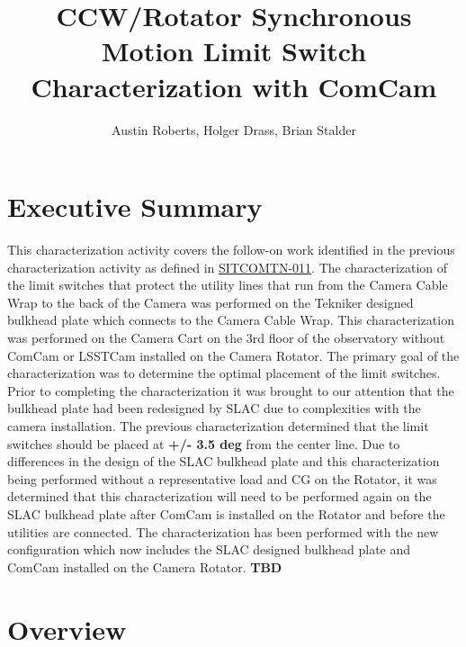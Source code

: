 \documentclass[SE,authoryear,toc]{lsstdoc}
\title{CCW/Rotator Synchronous Motion Limit Switch Characterization with ComCam}
\author{%
Austin Roberts, Holger Drass, Brian Stalder
}
\date{\vcsDate}
\begin{document}
\maketitle

\section{Executive Summary}

This characterization activity covers the follow-on work identified in the previous characterization activity as defined in \href{https://sitcomtn-011.lsst.io/}{SITCOMTN-011}. The characterization of the limit switches that protect the utility lines that run from the Camera Cable Wrap to the back of the Camera was performed on the Tekniker designed bulkhead plate which connects to the Camera Cable Wrap. This characterization was performed on the Camera Cart on the 3rd floor of the observatory without ComCam or LSSTCam installed on the Camera Rotator. The primary goal of the characterization was to determine the optimal placement of the limit switches. Prior to completing the characterization it was brought to our attention that the bulkhead plate had been redesigned by SLAC due to complexities with the camera installation. The previous characterization determined that the limit switches should be placed at \textbf{+/- 3.5 deg} from the center line. Due to differences in the design of the SLAC bulkhead plate and this characterization being performed without a representative load and CG on the Rotator, it was determined that this characterization will need to be performed again on the SLAC bulkhead plate after ComCam is installed on the Rotator and before the utilities are connected.
The characterization has been performed with the new configuration which now includes the SLAC designed bulkhead plate and ComCam installed on the Camera Rotator.
{\color{red}
\textbf{TBD}}


\section{Overview}
\end{document}
